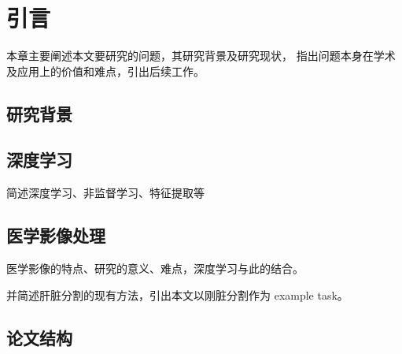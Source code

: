 
\chapter{引言}
本章主要阐述本文要研究的问题，其研究背景及研究现状，
指出问题本身在学术及应用上的价值和难点，引出后续工作。

\section{研究背景}


\section{深度学习}
简述深度学习、非监督学习、特征提取等

\section{医学影像处理}
医学影像的特点、研究的意义、难点，深度学习与此的结合。

并简述肝脏分割的现有方法，引出本文以刚脏分割作为 example task。

\section{论文结构}

